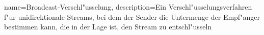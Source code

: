 {
  name=Broadcast-Verschl"usselung,
  description={Ein Verschl"usselungsverfahren f"ur unidirektionale Streams, bei dem der
  Sender die Untermenge der Empf"anger bestimmen kann, die in der Lage ist, den Stream
  zu entschl"usseln}
}

\renewcommand*{\glossaryname}{\section{\glossarName}}

\glsaddall
\printglossaries

